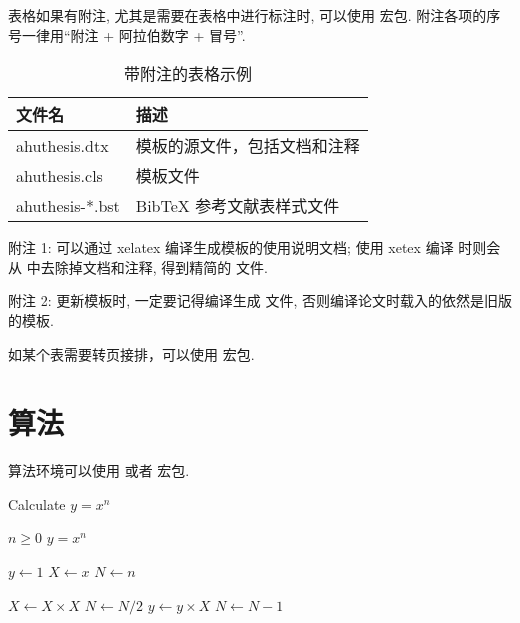表格如果有附注, 尤其是需要在表格中进行标注时, 可以使用  宏包.
附注各项的序号一律用“附注 + 阿拉伯数字 + 冒号”.

\begin{table}
  \centering
  \begin{threeparttable}[c]
    \caption{带附注的表格示例}
    \label{tab:three-part-table}
    \begin{tabular}{ll}
      \toprule
      文件名                 & 描述                         \\
      \midrule
      ahuthesis.dtx\tnote{1} & 模板的源文件，包括文档和注释 \\
      ahuthesis.cls\tnote{2} & 模板文件                     \\
      ahuthesis-*.bst        & BibTeX 参考文献表样式文件    \\
      \bottomrule
    \end{tabular}
    \begin{tablenotes}[online]
      \item[附注 1:] 可以通过 xelatex 编译生成模板的使用说明文档;
        使用 xetex 编译  时则会从  中去除掉文档和注释, 得到精简的  文件.
      \item[附注 2:] 更新模板时, 一定要记得编译生成  文件, 否则编译论文时载入的依然是旧版的模板.
    \end{tablenotes}
  \end{threeparttable}
\end{table}

如某个表需要转页接排，可以使用  宏包.


\section{算法}

算法环境可以使用  或者  宏包.

\renewcommand{\algorithmicrequire}{\textbf{输入：}\unskip}
\renewcommand{\algorithmicensure}{\textbf{输出：}\unskip}

\begin{algorithm}
  \caption{Calculate $y = x^n$}
  \label{alg1}
  \small
  \begin{algorithmic}
    \REQUIRE $n \geq 0$
    \ENSURE $y = x^n$

    \STATE $y \leftarrow 1$
    \STATE $X \leftarrow x$
    \STATE $N \leftarrow n$

        \STATE $X \leftarrow X \times X$
        \STATE $N \leftarrow N / 2$
      \ELSE[$N$ is odd]
        \STATE $y \leftarrow y \times X$
        \STATE $N \leftarrow N - 1$
      \ENDIF
    \ENDWHILE
  \end{algorithmic}
\end{algorithm}